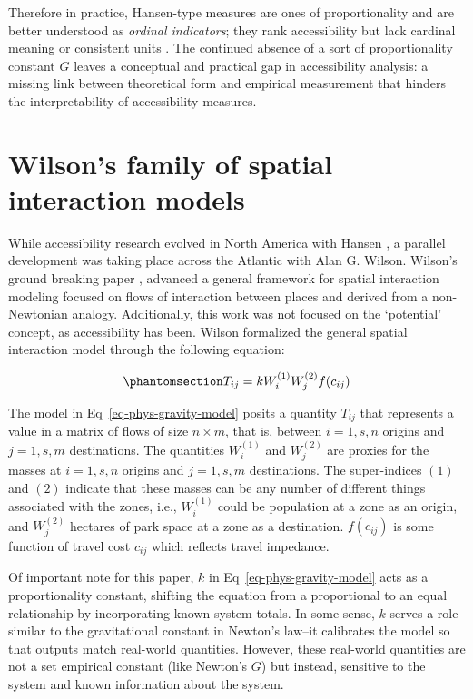 \documentclass[
  10pt,
  letterpaper,
]{article}
\begin{document}
Therefore in practice, Hansen-type measures are ones of proportionality
and are better understood as \emph{ordinal indicators}; they rank
accessibility but lack cardinal meaning or consistent units
\citep{millerAccessibilityMeasurementApplication2018}. The continued
absence of a sort of proportionality constant \(G\) leaves a conceptual
and practical gap in accessibility analysis: a missing link between
theoretical form and empirical measurement that hinders the
interpretability of accessibility measures.

\section{Wilson's family of spatial interaction
models}\label{wilsons-family-of-spatial-interaction-models}

While accessibility research evolved in North America with Hansen
\citep{hansen1959}, a parallel development was taking place across the
Atlantic with Alan G. Wilson. Wilson's ground breaking paper
\citep{wilson1971}, advanced a general framework for spatial interaction
modeling focused on flows of interaction between places and derived from
a non-Newtonian analogy. Additionally, this work was not focused on the
`potential' concept, as accessibility has been. Wilson
\citep{wilson1971} formalized the general spatial interaction model
through the following equation:

\begin{equation}\phantomsection\label{eq-phys-gravity-model}{
T_{ij} = k W_i^{(1)} W_j^{(2)} f(c_{ij})
}\end{equation}

The model in Eq~\ref{eq-phys-gravity-model} posits a quantity \(T_{ij}\)
that represents a value in a matrix of flows of size \(n \times m\),
that is, between \(i = 1,s, n\) origins and \(j = 1,s, m\) destinations.
The quantities \(W_i^{(1)}\) and \(W_j^{(2)}\) are proxies for the
masses at \(i=1,s,n\) origins and \(j=1,s,m\) destinations. The
super-indices \((1)\) and \((2)\) indicate that these masses can be any
number of different things associated with the zones, i.e.,
\(W_i^{(1)}\) could be population at a zone as an origin, and
\(W_j^{(2)}\) hectares of park space at a zone as a destination.
\(f(c_{ij})\) is some function of travel cost \(c_{ij}\) which reflects
travel impedance.

Of important note for this paper, \(k\) in
Eq~\ref{eq-phys-gravity-model} acts as a proportionality constant,
shifting the equation from a proportional to an equal relationship by
incorporating known system totals. In some sense, \(k\) serves a role
similar to the gravitational constant in Newton's law--it calibrates the
model so that outputs match real-world quantities. However, these
real-world quantities are not a set empirical constant (like Newton's
\(G\)) but instead, sensitive to the system and known information about
the system.
\end{document}
